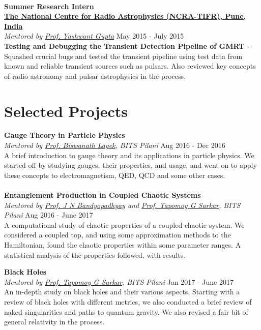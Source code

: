 \documentclass[margin, centered]{res}
\begin{document}
\begin{resume}
\\
\textbf{Summer Research Intern}\\
\textbf{\href{http://www.ncra.tifr.res.in/}{The National Centre for Radio Astrophysics (NCRA-TIFR), Pune, India}}\\
\emph{Mentored by \href{http://www.ncra.tifr.res.in/ncra/people/academic/ncra-faculty/Yashwant_Gupta}{Prof. Yashwant Gupta}} \hfill May 2015 - July 2015\\
\textbf{Testing and Debugging the Transient Detection Pipeline of GMRT} - Squashed crucial bugs and tested the transient pipeline using test data from known and reliable transient sources such as pulsars. Also reviewed key concepts of radio astronomy and pulsar astrophysics in the process.


\section{Selected Projects}

\textbf{Gauge Theory in Particle Physics}\\
\emph{Mentored by \href{http://universe.bits-pilani.ac.in/pilani/layek/profile}{Prof. Biswanath Layek}, BITS Pilani} \hfill Aug 2016 - Dec 2016\\
A brief introduction to gauge theory and its applications in particle physics. We started off by studying gauges, their properties, and usage, and went on to apply these concepts to electromagnetism, QED, QCD and some other cases. \\
\\
\textbf{Entanglement Production in Coupled Chaotic Systems}\\
\emph{Mentored by \href{http://www.bits-pilani.ac.in/Pilani/jayendra/Profile}{Prof. J N Bandyopadhyay} and \href{http://www.bits-pilani.ac.in/Pilani/tapomoy/Profile}{Prof. Tapomoy G Sarkar}, BITS Pilani} \hfill Aug 2016 - June 2017\\
A computational study of chaotic properties of a coupled chaotic system. We considered a coupled top, and using some approximation methods to the Hamiltonian, found the chaotic properties within some parameter ranges. A statistical analysis of the properties followed, with results.

\textbf{Black Holes}\\
\emph{Mentored by \href{http://www.bits-pilani.ac.in/Pilani/tapomoy/Profile}{Prof. Tapomoy G Sarkar}, BITS Pilani} \hfill Jan 2017 - June 2017\\
An in-depth study on black holes and their various aspects. Starting with a review of black holes with different metrics, we also conducted a brief review of naked singularities and paths to quantum gravity. We also revised a fair bit of general relativity in the process.



\end{resume}
\end{document}
